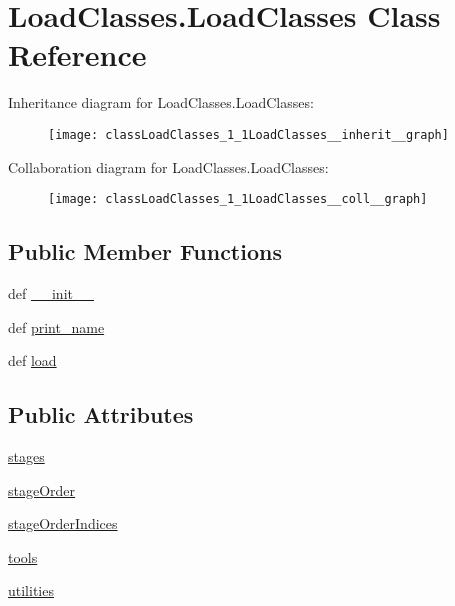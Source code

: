 \hypertarget{classLoadClasses_1_1LoadClasses}{\section{Load\-Classes.\-Load\-Classes Class Reference}
\label{classLoadClasses_1_1LoadClasses}
}


Inheritance diagram for Load\-Classes.\-Load\-Classes\-:\nopagebreak
\begin{figure}[H]
\begin{center}
\leavevmode
\texttt{[image: classLoadClasses\_1\_1LoadClasses\_\_inherit\_\_graph]}
\end{center}
\end{figure}


Collaboration diagram for Load\-Classes.\-Load\-Classes\-:\nopagebreak
\begin{figure}[H]
\begin{center}
\leavevmode
\texttt{[image: classLoadClasses\_1\_1LoadClasses\_\_coll\_\_graph]}
\end{center}
\end{figure}
\subsection*{Public Member Functions}
\begin{DoxyCompactItemize}
\item 
def \hyperlink{classLoadClasses_1_1LoadClasses_a9fe946ad6f966eb19a8877931c1dfe93}{\-\_\-\-\_\-init\-\_\-\-\_\-}
\item 
def \hyperlink{classLoadClasses_1_1LoadClasses_a4f90a379d556b30d456f402f8b368bee}{print\-\_\-name}
\item 
def \hyperlink{classLoadClasses_1_1LoadClasses_a9be449b4da8e5ab786f79c6388820727}{load}
\end{DoxyCompactItemize}
\subsection*{Public Attributes}
\begin{DoxyCompactItemize}
\item 
\hyperlink{classLoadClasses_1_1LoadClasses_aca4663cc6002ec1139e8b07f15aa1006}{stages}
\item 
\hyperlink{classLoadClasses_1_1LoadClasses_ab6a2b5f0576ced90a5aaa8c66b87e334}{stage\-Order}
\item 
\hyperlink{classLoadClasses_1_1LoadClasses_adb9a18af5fe6814c0c46e8c51f9682ef}{stage\-Order\-Indices}
\item 
\hyperlink{classLoadClasses_1_1LoadClasses_acea1357ee5b059c0c010c62d9dcdfd42}{tools}
\item 
\hyperlink{classLoadClasses_1_1LoadClasses_a9bc5a2e86aee8dffd444ea68bc9258de}{utilities}
\end{DoxyCompactItemize}


